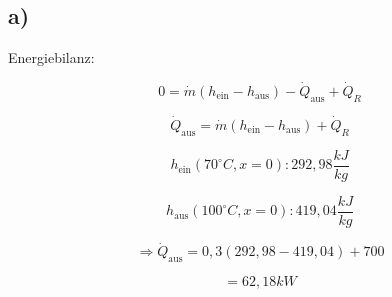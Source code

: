 

\subsection*{a)}
Energiebilanz:

\[
0 = \dot{m} (h_{\text{ein}} - h_{\text{aus}}) - \dot{Q}_{\text{aus}} + \dot{Q}_R
\]

\[
\dot{Q}_{\text{aus}} = \dot{m} (h_{\text{ein}} - h_{\text{aus}}) + \dot{Q}_R
\]

\[
h_{\text{ein}} (70^\circ C, x=0) : 292{,}98 \frac{kJ}{kg}
\]

\[
h_{\text{aus}} (100^\circ C, x=0) : 419{,}04 \frac{kJ}{kg}
\]

\[
\Rightarrow \dot{Q}_{\text{aus}} = 0{,}3 (292{,}98 - 419{,}04) + 700
\]

\[
= 62{,}18 kW
\]